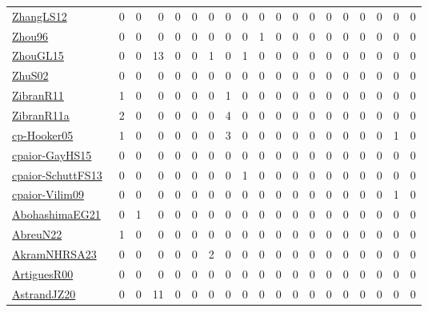 {\begin{longtable}{l*{18}{r}}
\href{papers/ZhangLS12.pdf}{ZhangLS12}~\cite{ZhangLS12} & 0 & 0 & 0 & 0 & 0 & 0 & 0 & 0 & 0 & 0 & 0 & 0 & 0 & 0 & 0 & 0 & 0 & 0\\
\href{papers/Zhou96.pdf}{Zhou96}~\cite{Zhou96} & 0 & 0 & 0 & 0 & 0 & 0 & 0 & 0 & 1 & 0 & 0 & 0 & 0 & 0 & 0 & 0 & 0 & 0\\
\href{papers/ZhouGL15.pdf}{ZhouGL15}~\cite{ZhouGL15} & 0 & 0 & 13 & 0 & 0 & 1 & 0 & 1 & 0 & 0 & 0 & 0 & 0 & 0 & 0 & 0 & 0 & 0\\
\href{papers/ZhuS02.pdf}{ZhuS02}~\cite{ZhuS02} & 0 & 0 & 0 & 0 & 0 & 0 & 0 & 0 & 0 & 0 & 0 & 0 & 0 & 0 & 0 & 0 & 0 & 0\\
\href{papers/ZibranR11.pdf}{ZibranR11}~\cite{ZibranR11} & 1 & 0 & 0 & 0 & 0 & 0 & 1 & 0 & 0 & 0 & 0 & 0 & 0 & 0 & 0 & 0 & 0 & 0\\
\href{papers/ZibranR11a.pdf}{ZibranR11a}~\cite{ZibranR11a} & 2 & 0 & 0 & 0 & 0 & 0 & 4 & 0 & 0 & 0 & 0 & 0 & 0 & 0 & 0 & 0 & 0 & 0\\
\href{papers/cp-Hooker05.pdf}{cp-Hooker05}~\cite{cp-Hooker05} & 1 & 0 & 0 & 0 & 0 & 0 & 3 & 0 & 0 & 0 & 0 & 0 & 0 & 0 & 0 & 0 & 1 & 0\\
\href{papers/cpaior-GayHS15.pdf}{cpaior-GayHS15}~\cite{cpaior-GayHS15} & 0 & 0 & 0 & 0 & 0 & 0 & 0 & 0 & 0 & 0 & 0 & 0 & 0 & 0 & 0 & 0 & 0 & 0\\
\href{papers/cpaior-SchuttFS13.pdf}{cpaior-SchuttFS13}~\cite{cpaior-SchuttFS13} & 0 & 0 & 0 & 0 & 0 & 0 & 0 & 1 & 0 & 0 & 0 & 0 & 0 & 0 & 0 & 0 & 0 & 0\\
\href{papers/cpaior-Vilim09.pdf}{cpaior-Vilim09}~\cite{cpaior-Vilim09} & 0 & 0 & 0 & 0 & 0 & 0 & 0 & 0 & 0 & 0 & 0 & 0 & 0 & 0 & 0 & 0 & 1 & 0\\
\href{articles/AbohashimaEG21.pdf}{AbohashimaEG21}~\cite{AbohashimaEG21} & 0 & 1 & 0 & 0 & 0 & 0 & 0 & 0 & 0 & 0 & 0 & 0 & 0 & 0 & 0 & 0 & 0 & 0\\
\href{articles/AbreuN22.pdf}{AbreuN22}~\cite{AbreuN22} & 1 & 0 & 0 & 0 & 0 & 0 & 0 & 0 & 0 & 0 & 0 & 0 & 0 & 0 & 0 & 0 & 0 & 0\\
\href{articles/AkramNHRSA23.pdf}{AkramNHRSA23}~\cite{AkramNHRSA23} & 0 & 0 & 0 & 0 & 0 & 2 & 0 & 0 & 0 & 0 & 0 & 0 & 0 & 0 & 0 & 0 & 0 & 0\\
\href{articles/ArtiguesR00.pdf}{ArtiguesR00}~\cite{ArtiguesR00} & 0 & 0 & 0 & 0 & 0 & 0 & 0 & 0 & 0 & 0 & 0 & 0 & 0 & 0 & 0 & 0 & 0 & 0\\
\href{articles/AstrandJZ20.pdf}{AstrandJZ20}~\cite{AstrandJZ20} & 0 & 0 & 11 & 0 & 0 & 0 & 0 & 0 & 0 & 0 & 0 & 0 & 0 & 0 & 0 & 0 & 0 & 0\\

\end{longtable}}
